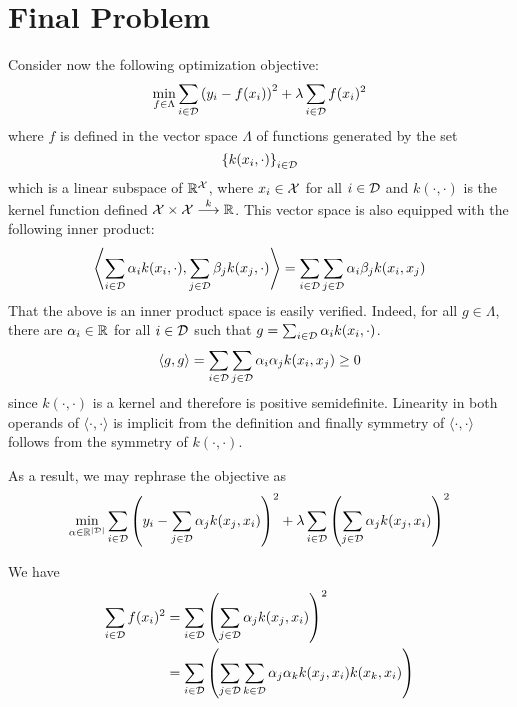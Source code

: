 \documentclass[12pt]{article}
\begin{document}
\section{Final Problem}
Consider now the following optimization objective: 
\begin{equation*}
    \min_{f\in\Lambda}\sum_{i\in{\cal D}}\left(y_i - f(x_i)\right)^2 + \lambda\sum_{i\in{\cal D}}f(x_i)^2
\end{equation*}
where $f$ is defined in the vector space $\Lambda$ of functions generated by the set 
\begin{equation*}
    \left\{k(x_i,\cdot)\right\}_{i\in{\cal D}}
\end{equation*}
which is a linear subspace of $\mathbb R^{{\cal X}}$, where $x_i\in{\cal X}$ for all $i\in{\cal D}$ and $k(\cdot,\cdot)$ is the kernel function defined ${\cal X}\times{\cal X}\stackrel{k}{\longrightarrow}\mathbb R$. This vector space is also equipped with the following inner product: 
\begin{equation*}
    \left\langle\sum_{i\in{\cal D}}\alpha_ik(x_i,\cdot), \sum_{j\in{\cal D}}\beta_jk(x_j,\cdot)\right\rangle = \sum_{i\in{\cal D}}\sum_{j\in{\cal D}}\alpha_i\beta_jk(x_i,x_j)
\end{equation*}
That the above is an inner product space is easily verified. Indeed, for all $g\in\Lambda$, there are $\alpha_i\in\mathbb R$ for all $i\in{\cal D}$ such that $g = \sum_{i\in{\cal D}}\alpha_ik(x_i,\cdot)$.
\begin{equation*}
    \langle g,g\rangle = \sum_{i\in{\cal D}}\sum_{j\in{\cal D}}\alpha_i\alpha_jk(x_i,x_j)\ge0
\end{equation*}
since $k(\cdot,\cdot)$ is a kernel and therefore is positive semidefinite. Linearity in both operands of $\langle\cdot,\cdot\rangle$ is implicit from the definition and finally symmetry of $\langle\cdot,\cdot\rangle$ follows from the symmetry of $k(\cdot,\cdot)$.

As a result, we may rephrase the objective as
\begin{equation*}
    \min_{\mathbf{\alpha}\in\mathbb R^{|{\cal D}|}}\sum_{i\in{\cal D}}\left(y_i - \sum_{j\in{\cal D}}\alpha_jk(x_j, x_i)\right)^2 + \lambda\sum_{i\in{\cal D}}\left(\sum_{j\in{\cal D}}\alpha_jk(x_j,x_i)\right)^2
\end{equation*}

We have 
\begin{align*}
    \sum_{i\in{\cal D}}f(x_i)^2 &= \sum_{i\in{\cal D}}\left(\sum_{j\in{\cal D}}\alpha_jk(x_j,x_i)\right)^2\\
    &= \sum_{i\in{\cal D}}\left(\sum_{j\in{\cal D}}\sum_{k\in{\cal D}}\alpha_j\alpha_kk(x_j, x_i)k(x_k,x_i)\right)
\end{align*}
\end{document}
